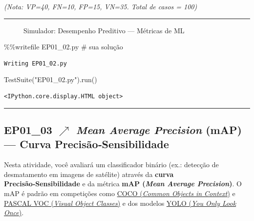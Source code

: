 \documentclass[
  portuguese,
  letterpaper,
  openany,
  oneside,
  12pt,
  a4paper]{book}
\newenvironment{Shaded}{\begin{snugshade}}{\end{snugshade}}
\newcommand{\CommentTok}[1]{\textcolor[rgb]{0.37,0.37,0.37}{#1}}
\newcommand{\NormalTok}[1]{\textcolor[rgb]{0.00,0.23,0.31}{#1}}
\newcommand{\OperatorTok}[1]{\textcolor[rgb]{0.37,0.37,0.37}{#1}}
\newcommand{\StringTok}[1]{\textcolor[rgb]{0.13,0.47,0.30}{#1}}
\begin{document}
\emph{(Nota: VP=40, FN=10, FP=15, VN=35. Total de casos = 100)}

\begin{center}\rule{0.5\linewidth}{0.5pt}\end{center}

\begin{figure}


\caption{\label{fig-01-desempenho-preditivo}Simulador: Desempenho
Preditivo --- Métricas de ML}

\end{figure}%

\begin{Shaded}
\begin{Highlighting}[]
\OperatorTok{\%\%}\NormalTok{writefile EP01\_02.py}
\CommentTok{\# sua solução}
\end{Highlighting}
\end{Shaded}

\begin{verbatim}
Writing EP01_02.py
\end{verbatim}

\begin{Shaded}
\begin{Highlighting}[]
\NormalTok{TestSuite(}\StringTok{"EP01\_02.py"}\NormalTok{).run()}
\end{Highlighting}
\end{Shaded}

\begin{verbatim}
<IPython.core.display.HTML object>
\end{verbatim}

\begin{center}\rule{0.5\linewidth}{0.5pt}\end{center}

\subsection{\texorpdfstring{EP01\_03 $\nearrow$ \emph{Mean Average
Precision} (mAP) --- Curva
Precisão‑Sensibilidade}{EP01\_03  Mean Average Precision (mAP) --- Curva Precisão‑Sensibilidade}}\label{ep01_03-mean-average-precision-map-curva-precisuxe3osensibilidade}

Nesta atividade, você avaliará um classificador binário (ex.: detecção
de desmatamento em imagens de satélite) através da \textbf{curva
Precisão‑Sensibilidade} e da métrica \textbf{mAP (\emph{Mean Average
Precision})}. O mAP é padrão em competições como
\href{https://cocodataset.org/}{COCO (\emph{Common Objects in Context})}
e \href{http://host.robots.ox.ac.uk/pascal/VOC/}{PASCAL VOC
(\emph{Visual Object Classes})} e dos modelos
\href{https://github.com/ultralytics/ultralytics}{YOLO (\emph{You Only
Look Once})}.
\end{document}
